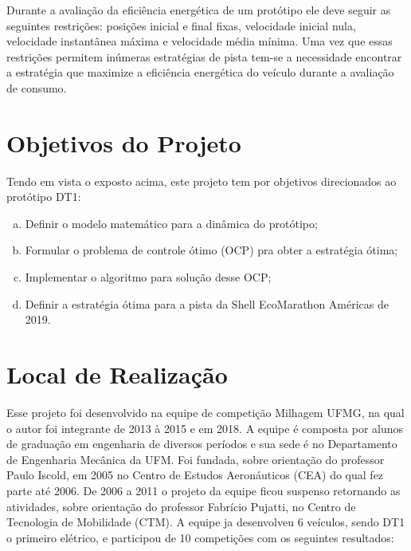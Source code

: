 Durante a avaliação da eficiência energética de um protótipo ele deve seguir as seguintes
restrições: posições inicial e final fixas, velocidade inicial nula, velocidade instantânea
máxima e velocidade média mínima. Uma vez que essas restrições permitem inúmeras
estratégias de pista tem-se a necessidade encontrar a estratégia que maximize a
eficiência energética do veículo durante a avaliação de consumo.


\section{Objetivos do Projeto}
\label{sec:objetivos}

Tendo em vista o exposto acima, este projeto tem por objetivos direcionados ao protótipo DT1:

\begin{enumerate}[(a)]
    \item Definir o modelo matemático para a dinâmica do protótipo;
    \item Formular o problema de controle ótimo (OCP) pra obter a estratégia ótima;
    \item Implementar o algoritmo para solução desse OCP;
    \item Definir a estratégia ótima para a pista da Shell EcoMarathon Américas de 2019.
\end{enumerate}

\section{Local de Realização}
\label{sec:empresa}


Esse projeto foi desenvolvido na equipe de competição Milhagem UFMG, na qual o autor foi integrante de 2013 à 2015 e em 2018. A equipe é composta por alunos de graduação em engenharia de diversos períodos e sua sede é no Departamento de Engenharia Mecânica da UFM.
Foi fundada, sobre orientação do
professor Paulo Iscold, em 2005 no Centro de Estudos Aeronáuticos (CEA) do qual fez
parte até 2006.
De 2006 a 2011 o projeto da equipe ficou suspenso retornando as atividades, sobre orientação do professor Fabrício Pujatti, no Centro de Tecnologia
de Mobilidade (CTM). A equipe ja desenvolveu 6 veículos, sendo DT1 o primeiro elétrico, e participou de 10 competições com os seguintes resultados:


